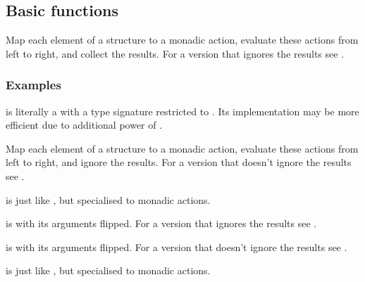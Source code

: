 \subsection{Basic  functions}
\begin{haddockdesc}
\item[\begin{tabular}{@{}l}
mapM :: (Traversable t, Monad m) => (a -> m b) -> t a -> m (t b)
\end{tabular}]
{\haddockbegindoc
Map each element of a structure to a monadic action, evaluate
 these actions from left to right, and collect the results. For
 a version that ignores the results see .\par
\subsubsection*{\textbf{Examples}}
 is literally a  with a type signature restricted
 to . Its implementation may be more efficient due to additional
 power of .\par}
\end{haddockdesc}
\begin{haddockdesc}
\item[\begin{tabular}{@{}l}
mapM{\char '137} :: (Foldable t, Monad m) => (a -> m b) -> t a -> m ()
\end{tabular}]
{\haddockbegindoc
Map each element of a structure to a monadic action, evaluate
 these actions from left to right, and ignore the results.  For a
 version that doesn't ignore the results see
 .\par
{} is just like , but specialised to monadic actions.\par}
\end{haddockdesc}
\begin{haddockdesc}
\item[\begin{tabular}{@{}l}
forM :: (Traversable t, Monad m) => t a -> (a -> m b) -> m (t b)
\end{tabular}]
{\haddockbegindoc
{} is  with its arguments flipped. For a version that
 ignores the results see .\par}
\end{haddockdesc}
\begin{haddockdesc}
\item[\begin{tabular}{@{}l}
forM{\char '137} :: (Foldable t, Monad m) => t a -> (a -> m b) -> m ()
\end{tabular}]
{\haddockbegindoc
{} is  with its arguments flipped.  For a version that
 doesn't ignore the results see .\par
{} is just like , but specialised to monadic actions.\par}
\end{haddockdesc}
